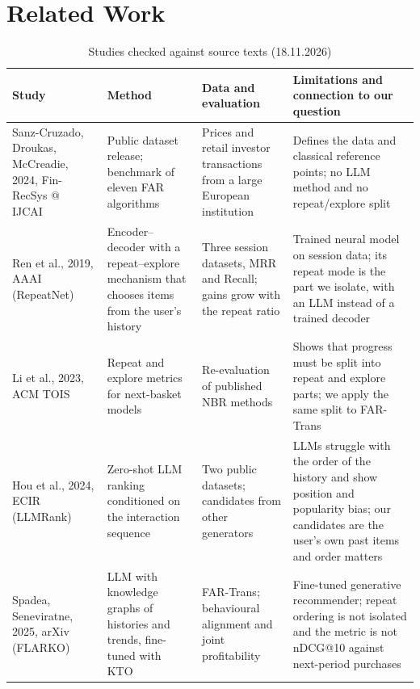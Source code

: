 \documentclass[conference]{IEEEtran}
\begin{document}
\section{Related Work}

\begin{table}[t]
\caption{Studies checked against source texts (18.11.2026)}
\label{tab:lit}
\centering
\footnotesize
\begin{tabular}{@{}>{\raggedright\arraybackslash}p{3.3cm}>{\raggedright\arraybackslash}p{3.6cm}>{\raggedright\arraybackslash}p{4.0cm}>{\raggedright\arraybackslash}p{5.6cm}@{}}
\toprule
Study & Method & Data and evaluation & Limitations and connection to our question\\
\midrule
Sanz-Cruzado, Droukas, McCreadie, 2024, Fin-RecSys @ IJCAI~\cite{farTrans} & Public dataset release; benchmark of eleven FAR algorithms & Prices and retail investor transactions from a large European institution & Defines the data and classical reference points; no LLM method and no repeat/explore split\\
Ren et al., 2019, AAAI (RepeatNet)~\cite{repeatnet} & Encoder--decoder with a repeat--explore mechanism that chooses items from the user's history & Three session datasets, MRR and Recall; gains grow with the repeat ratio & Trained neural model on session data; its repeat mode is the part we isolate, with an LLM instead of a trained decoder\\
Li et al., 2023, ACM TOIS~\cite{nbrcheck} & Repeat and explore metrics for next-basket models & Re-evaluation of published NBR methods & Shows that progress must be split into repeat and explore parts; we apply the same split to FAR-Trans\\
Hou et al., 2024, ECIR (LLMRank)~\cite{llmrank} & Zero-shot LLM ranking conditioned on the interaction sequence & Two public datasets; candidates from other generators & LLMs struggle with the order of the history and show position and popularity bias; our candidates are the user's own past items and order matters\\
Spadea, Seneviratne, 2025, arXiv (FLARKO)~\cite{flarko} & LLM with knowledge graphs of histories and trends, fine-tuned with KTO & FAR-Trans; behavioural alignment and joint profitability & Fine-tuned generative recommender; repeat ordering is not isolated and the metric is not nDCG@10 against next-period purchases\\
\bottomrule
\end{tabular}
\end{table}
\end{document}
